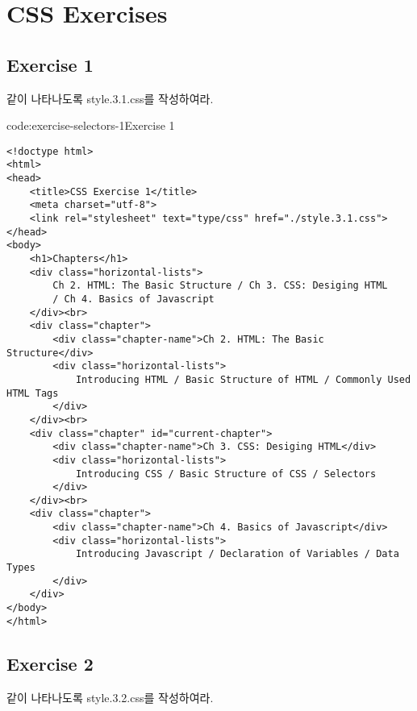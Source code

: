 \section{CSS Exercises} \label{sect:css-exercises}

\subsection*{Exercise 1}
\이 \과 같이 나타나도록 style.3.1.css를 작성하여라.

    {}

\begin{codeenv}{code:exercise-selectors-1}{Exercise 1}\begin{verbatim}
<!doctype html>
<html>
<head>
    <title>CSS Exercise 1</title>
    <meta charset="utf-8">
    <link rel="stylesheet" text="type/css" href="./style.3.1.css">
</head>
<body>
    <h1>Chapters</h1>
    <div class="horizontal-lists">
        Ch 2. HTML: The Basic Structure / Ch 3. CSS: Desiging HTML
        / Ch 4. Basics of Javascript
    </div><br>
    <div class="chapter">
        <div class="chapter-name">Ch 2. HTML: The Basic Structure</div>
        <div class="horizontal-lists">
            Introducing HTML / Basic Structure of HTML / Commonly Used HTML Tags
        </div>
    </div><br>
    <div class="chapter" id="current-chapter">
        <div class="chapter-name">Ch 3. CSS: Desiging HTML</div>
        <div class="horizontal-lists">
            Introducing CSS / Basic Structure of CSS / Selectors
        </div>
    </div><br>
    <div class="chapter">
        <div class="chapter-name">Ch 4. Basics of Javascript</div>
        <div class="horizontal-lists">
            Introducing Javascript / Declaration of Variables / Data Types
        </div>
    </div>
</body>
</html>
\end{verbatim}
\end{codeenv}

\subsection*{Exercise 2}

\이 \과 같이 나타나도록 style.3.2.css를 작성하여라.

    {}

